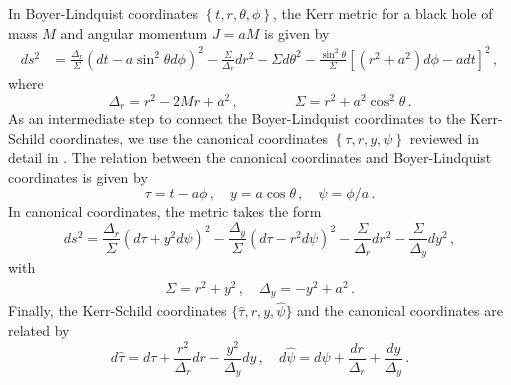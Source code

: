 In Boyer-Lindquist coordinates $\left\lbrace t, r, \theta, \phi \right\rbrace$, the Kerr metric for a black hole of mass $M$ and angular momentum $J = a M$ is given by \cite{boyer1967maximal}
\begin{equation}
\begin{aligned}
ds^2 &=  \frac{\Delta_r}{\Sigma} \left(dt -  a \sin^2{\theta} d \phi \right)^2 - \frac{\Sigma}{\Delta_r} dr^2 - \Sigma d \theta^2 - \frac{\sin^2\theta}{\Sigma} \left\lbrack \left(r^2 + a^2\right) d \phi - a dt \right\rbrack^2 \, , 
\end{aligned}
\end{equation}
where
\begin{equation}
\Delta_r = r^2 - 2 M r + a^2 \, , \qquad  \qquad \Sigma = r^2 + a^2 \cos^2{\theta} \, .
\end{equation}
As an intermediate step to connect the Boyer-Lindquist coordinates to the Kerr-Schild coordinates, we use the canonical coordinates $\left\lbrace \tau, r, y, \psi \right\rbrace$ reviewed in detail in \cite{Frolov:2017kze}. The relation between the canonical coordinates and Boyer-Lindquist coordinates is given by
\begin{equation}\label{Penrose:eqn:canonicalcoord}
\tau = t - a \phi  \, , \quad y = a \cos{\theta} \, , \quad \psi = \phi/a \, .
\end{equation}
In canonical coordinates, the metric takes the form
\begin{equation}
ds^2 = \frac{\Delta_r}{\Sigma}\left(d\tau + y^2 d\psi \right)^2 - \frac{\Delta_y}{\Sigma}\left(d\tau - r^2 d\psi \right)^2 - \frac{\Sigma}{\Delta_r} dr^2 - \frac{\Sigma}{\Delta_y} dy^2 \, ,  
\end{equation}
with
\begin{equation}\label{Penrose:eqn:Sigma}
\begin{aligned}
\Sigma = r^2 + y^2  \, , \quad \Delta_y = -y^2+a^2 \, . 
\end{aligned}
\end{equation}
Finally, the Kerr-Schild coordinates $\lbrace \hat{\tau}, r, y, \hat{\psi} \rbrace$ and the canonical coordinates are related by \cite{Frolov:2017kze} 
\begin{equation}\label{Penrose:eqn:KScoord}
d\hat{\tau} = d\tau + \frac{r^2}{\Delta_r} dr - \frac{y^2}{\Delta_y} dy \, , \quad d\hat{\psi} = d \psi + \frac{dr}{\Delta_r} + \frac{dy}{\Delta_y} \, .
\end{equation}
